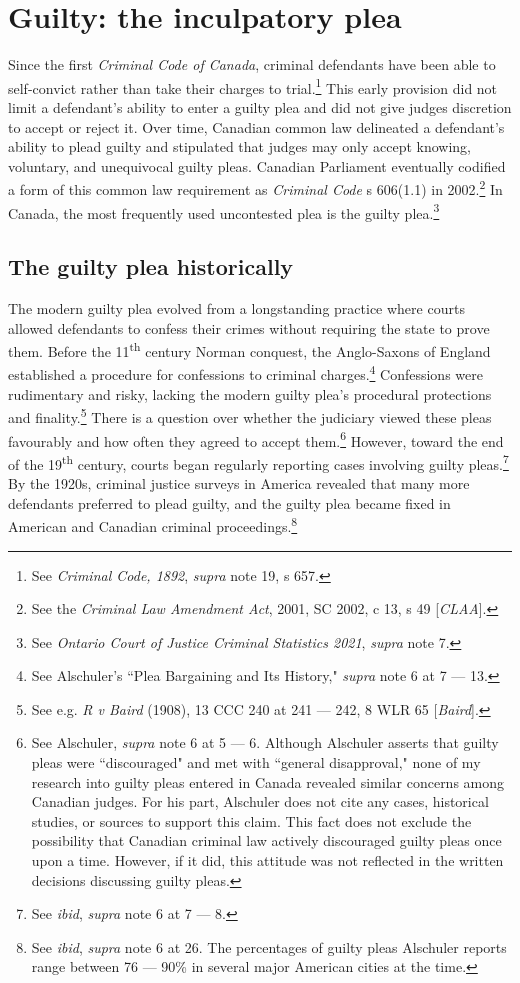 \section{Guilty: the inculpatory plea}

Since the first \textit{Criminal Code of Canada}, criminal defendants have been able to self-convict rather than take their charges to trial.\footnote{See \textit{Criminal Code, 1892}, \textit{supra} note 19, s 657.} This early provision did not limit a defendant's ability to enter a guilty plea and did not give judges discretion to accept or reject it. Over time, Canadian common law delineated a defendant's ability to plead guilty and stipulated that judges may only accept knowing, voluntary, and unequivocal guilty pleas. Canadian Parliament eventually codified a form of this common law requirement as \textit{Criminal Code} s 606(1.1) in 2002.\footnote{See the \textit{Criminal Law Amendment Act}, 2001, SC 2002, c 13, s 49 [\textit{CLAA}].} In Canada, the most frequently used uncontested plea is the guilty plea.\footnote{See \textit{Ontario Court of Justice Criminal Statistics 2021}, \textit{supra} note 7.}

\subsection{The guilty plea historically}

The modern guilty plea evolved from a longstanding practice where courts allowed defendants to confess their crimes without requiring the state to prove them. Before the 11\textsuperscript{th} century Norman conquest, the Anglo-Saxons of England established a procedure for confessions to criminal charges.\footnote{See Alschuler's ``Plea Bargaining and Its History," \textit{supra} note 6 at 7 — 13.} Confessions were rudimentary and risky, lacking the modern guilty plea's procedural protections and finality.\footnote{See e.g. \textit{R v Baird} (1908), 13 CCC 240 at 241 — 242, 8 WLR 65 [\textit{Baird}].} There is a question over whether the judiciary viewed these pleas favourably and how often they agreed to accept them.\footnote{See Alschuler, \textit{supra} note 6 at 5 — 6. Although Alschuler asserts that guilty pleas were ``discouraged" and met with ``general disapproval," none of my research into guilty pleas entered in Canada revealed similar concerns among Canadian judges. For his part, Alschuler does not cite any cases, historical studies, or sources to support this claim. This fact does not exclude the possibility that Canadian criminal law actively discouraged guilty pleas once upon a time. However, if it did, this attitude was not reflected in the written decisions discussing guilty pleas.} However, toward the end of the 19\textsuperscript{th} century, courts began regularly reporting cases involving guilty pleas.\footnote{See \textit{ibid}, \textit{supra} note 6 at 7 — 8.} By the 1920s, criminal justice surveys in America revealed that many more defendants preferred to plead guilty, and the guilty plea became fixed in American and Canadian criminal proceedings.\footnote{See \textit{ibid}, \textit{supra} note 6 at 26. The percentages of guilty pleas Alschuler reports range between 76 — 90\% in several major American cities at the time.}

